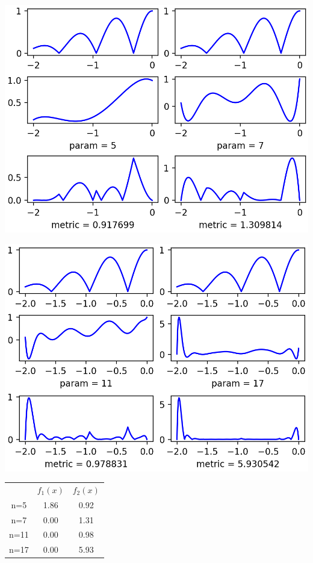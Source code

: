 \documentclass{article}
\begin{document}
\begin{Center}
\includegraphics{F2_p5p7_Lagrange.png}

\includegraphics{F2_p11p17_Lagrange.png}

\begin{center}
	
	\begin{tabular}{ c   c   c}
		& \(f_1(x)\) & \(f_2(x)\) \\
		n=5 & 1.86 & 0.92 \\ 
		n=7 & 0.00 & 1.31 \\  
		n=11 & 0.00 & 0.98 \\
		n=17 &  0.00 & 5.93
	\end{tabular}
	
\end{center}
\end{Center}
\end{document}
